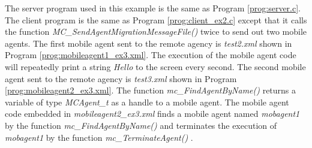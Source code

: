 \documentclass[11pt]{report}
\begin{document}
The server program used in this example is the same as Program 
\vref{prog:server.c}. 
The client program is the same as Program \vref{prog:client_ex2.c} except 
that it calls the function \textit{MC\_SendAgentMigrationMessageFile()} twice 
to send out two mobile agents.
The first mobile agent sent to the remote agency is 
\textit{test2.xml} shown in Program 
\vref{prog:mobileagent1_ex3.xml}.
The execution of the mobile agent code will repeatedly print a string 
\textit{Hello} to the screen every second.
The second mobile agent sent to the remote agency is 
\textit{test3.xml} shown in Program 
\vref{prog:mobileagent2_ex3.xml}.
The function \textit{mc\_FindAgentByName()} 
returns a variable of type 
\textit{MCAgent\_t} as a handle to a mobile agent. 
The mobile agent code embedded in \textit{mobileagent2\_ex3.xml} finds a 
mobile agent named \textit{mobagent1} by the function 
\textit{mc\_FindAgentByName()} and terminates the execution of 
\textit{mobagent1} by the function \textit{mc\_TerminateAgent()}
. 

\noindent
\end{document}

